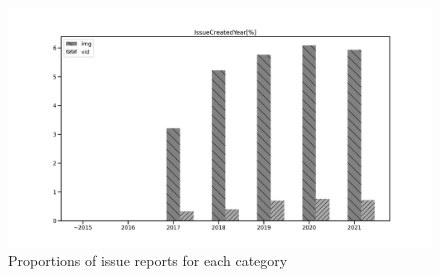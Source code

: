 \begin{figure}[h]
\centering
\includegraphics[width=0.6\linewidth]{./figures/data-category-trend.pdf}
\caption{ 
  Proportions of issue reports for each category
  }
\label{fig:data-cat-trend}
\end{figure}